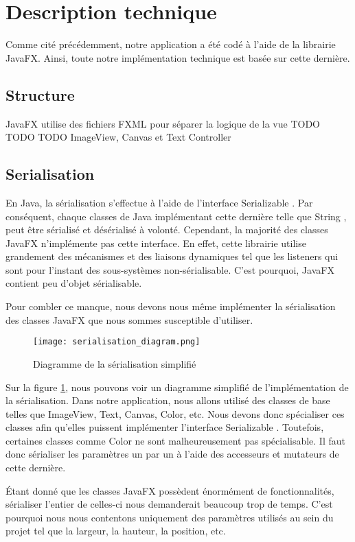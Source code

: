 \section{Description technique}

Comme cité précédemment, notre application a été codé à l'aide de la librairie JavaFX. Ainsi, toute notre implémentation technique est basée sur cette dernière. 

\subsection{Structure}
JavaFX utilise des fichiers FXML pour séparer la logique de la vue TODO TODO TODO
ImageView, Canvas et Text
Controller

\subsection{Serialisation}
En Java, la sérialisation s'effectue à l'aide de l'interface \og Serializable \fg{}. Par conséquent, chaque classes de Java implémentant cette dernière telle que \og String \fg{}, peut être sérialisé et désérialisé à volonté. Cependant, la majorité des classes JavaFX n'implémente pas cette interface. En effet, cette librairie utilise grandement des mécanismes et des liaisons dynamiques tel que les listeners qui sont pour l'instant des sous-systèmes non-sérialisable. C'est pourquoi, JavaFX contient peu d'objet sérialisable.

Pour combler ce manque, nous devons nous même implémenter la sérialisation des classes JavaFX que nous sommes susceptible d'utiliser. 

\begin{figure}[h]
    \caption{Diagramme de la sérialisation simplifié}
    \centering
    \texttt{[image: serialisation\_diagram.png]}
    \label{fig:seri_diag}
\end{figure}

Sur la figure \ref{fig:seri_diag}, nous pouvons voir un diagramme simplifié de l'implémentation de la sérialisation. Dans notre application, nous allons utilisé des classes de base telles que ImageView, Text, Canvas, Color, etc. Nous devons donc spécialiser ces classes afin qu'elles puissent implémenter l'interface \og Serializable \fg{}. Toutefois, certaines classes comme \og Color \fg{} ne sont malheureusement pas spécialisable. Il faut donc sérialiser les paramètres un par un à l'aide des accesseurs et mutateurs de cette dernière.

Étant donné que les classes JavaFX possèdent énormément de fonctionnalités, sérialiser l'entier de celles-ci nous demanderait beaucoup trop de temps. C'est pourquoi nous nous contentons uniquement des paramètres utilisés au sein du projet tel que la largeur, la hauteur, la position, etc. 

